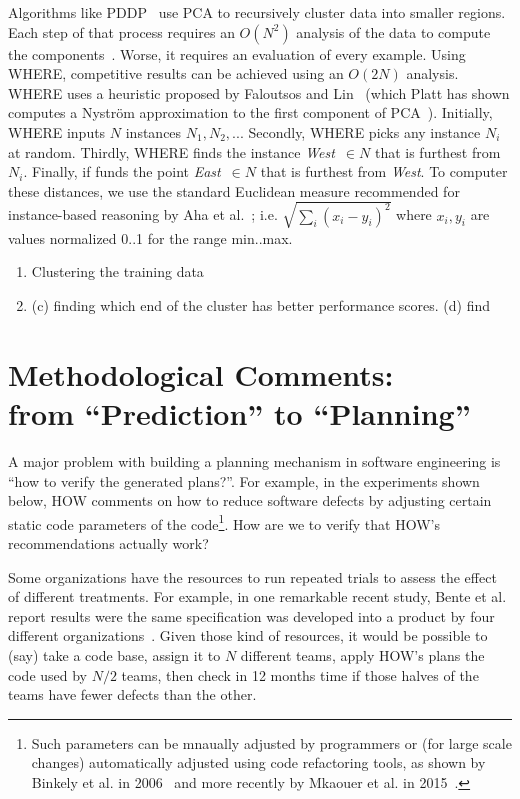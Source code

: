 \documentclass[conference]{IEEEtran}
\newcommand{\be}{\begin{enumerate}}
\newcommand{\ee}{\end{enumerate}}
\begin{document}
Algorithms like PDDP~\cite{boley98} use PCA to
recursively cluster data into smaller regions. Each
step of that process requires an $O(N^2)$ analysis
of the data to compute the components~\cite{ilin10}. Worse, it requires an evaluation of every example.
Using WHERE, competitive results can be achieved
using an $O(2N)$ analysis.
WHERE uses a heuristic proposed by
Faloutsos and Lin~\cite{Faloutsos1995}
(which
Platt has
  shown computes a Nystr\"om
  approximation to the first component of
  PCA~\cite{platt05}).
Initially, WHERE inputs
$N$
instances $N_1,N_2,..$. Secondly, WHERE
picks any
instance $N_i$ at random. Thirdly, WHERE
finds the instance  {\em West}~$\in N$ that is
furthest from $N_i$. Finally,
if funds the point {\em East}~$\in N$ 
that is furthest from {\em West}. To computer these distances,
we use the standard Euclidean measure recommended for
instance-based reasoning by Aha et al.~\cite{aha91};
i.e. $\sqrt{\sum_i(x_i-y_i)^2}$ where $x_i,y_i$
are values normalized 0..1 for the range min..max.


\be
\item Clustering the training data 
\item 
(c) finding which end of the cluster has better performance scores.
(d) find
\ee

\section{Methodological Comments:\\ from ``Prediction'' to ``Planning''}
A major  problem with building a planning mechanism in software engineering is ``how to verify the generated
plans?''. For example,  in the experiments shown below,  HOW comments  on how to reduce
software defects by adjusting certain static code parameters of the code\footnote{Such parameters can be mnaually adjusted by programmers or (for large scale changes) automatically adjusted using code refactoring
tools, as shown by Binkely et al. in 2006~\cite{Binkley2006} and more recently by Mkaouer et al. in 2015~\cite{Mkaouer15}.}. How are we to verify that HOW's recommendations actually work? 

Some organizations have the resources to 
run repeated trials to assess the effect of different treatments.
For example, in one remarkable recent study, Bente et al. report results
were the same specification was developed into a product by four different organizations~\cite{Anda2009}. Given those kind of resources, it would be possible
to (say) take a code base, assign it to $N$ different teams, apply
HOW's plans the code used by  $N/2$ teams, then check in 12 months time
if those halves of the teams have fewer defects than the other.  
\end{document}
